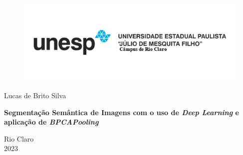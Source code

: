 \begin{titlepage}
    \begin{figure}[H]
        \centering
        \includegraphics[width=1\linewidth]{recursos/imagens/capa/unesp.png}
    \end{figure}
   \begin{center}

       \vspace*{1cm}

       \Large Lucas de Brito Silva

       \vspace*{2.3cm}
       
       \textbf{Segmentação Semântica de Imagens com o uso de \textit{Deep Learning} e aplicação de \textit{BPCAPooling}}
       \normalsize
       
       \vspace{1.5cm}


       \vfill
            
       Rio Claro \\
       2023
            
   \end{center}
\end{titlepage}